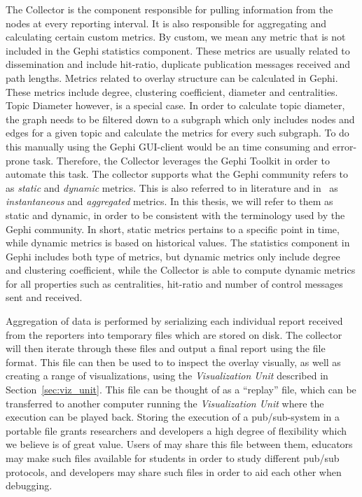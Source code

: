 The Collector is the component responsible for pulling information from
the nodes at every reporting interval. It is also responsible for
aggregating and calculating certain custom metrics. By custom, we mean
any metric that is not included in the Gephi statistics component. These
metrics are usually related to dissemination and include hit-ratio,
duplicate publication messages received and path lengths. Metrics
related to overlay structure can be calculated in Gephi. These metrics
include degree, clustering coefficient, diameter and centralities. Topic
Diameter however, is a special case. In order to calculate topic
diameter, the graph needs to be filtered down to a subgraph which only
includes nodes and edges for a given topic and calculate the metrics for
every such subgraph. To do this manually using
the Gephi GUI-client would be an time consuming and error-prone task.
Therefore, the Collector  leverages the Gephi Toolkit in order to
automate this task. The collector supports what the Gephi community
refers to as \emph{static} and \emph{dynamic} metrics. This is also
referred to in literature and in~\cite{korsveien2014vizpub} as
\emph{instantaneous} and \emph{aggregated} metrics. In this thesis, we
will refer to them as static and dynamic, in order to be consistent
with the terminology used by the Gephi community. In short, static
metrics pertains to a specific point in time, while dynamic metrics is
based on historical values. The statistics component in Gephi includes
both type of metrics, but dynamic metrics only include degree and
clustering coefficient, while the Collector is able to compute dynamic
metrics for all properties such as centralities, hit-ratio and number of
control messages sent and received.

Aggregation of data is performed by serializing each individual report received
from the reporters into temporary files which are stored on disk. The
collector will then iterate through these files and output a final
report using the \gexf{} file format. This file can then be used to
to inspect the overlay visually, as well as creating a range of
visualizations, using the \emph{Visualization Unit}
described in Section~\ref{sec:viz_unit}. This file can be thought of as
a ``replay'' file, which can be transferred to another computer running
the \emph{Visualization Unit} where the execution can be played back.
Storing the execution of a pub/sub-system in a portable file grants
researchers and developers a high degree of flexibility which we believe
is of great value. Users of \demo{} may share this file between them,
educators may make such files available for students in order to study
different pub/sub protocols, and developers may share such files in
order to aid each other when debugging.

